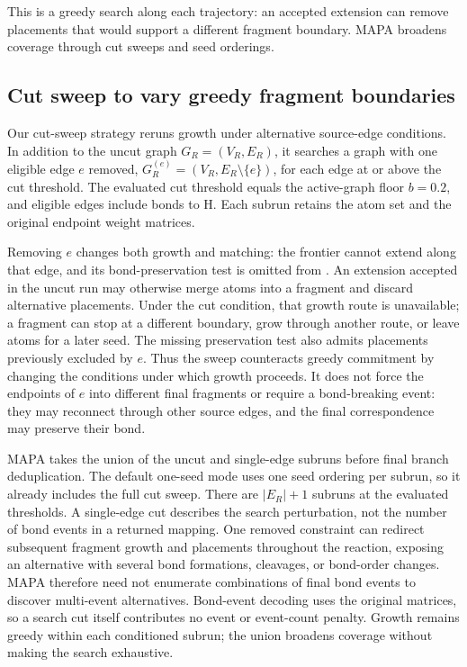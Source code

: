 This is a greedy search along each trajectory: an accepted extension can remove placements that would support a different fragment boundary. MAPA broadens coverage through cut sweeps and seed orderings.

\subsection{Cut sweep to vary greedy fragment boundaries}
\label{sec:cut-sweep}

Our cut-sweep strategy reruns growth under alternative source-edge conditions. In addition to the uncut graph $G_R=(V_R,E_R)$, it searches a graph with one eligible edge $e$ removed, $G_R^{(e)}=(V_R,E_R\setminus\{e\})$, for each edge at or above the cut threshold. The evaluated cut threshold equals the active-graph floor $b=0.2$, and eligible edges include bonds to H. Each subrun retains the atom set and the original endpoint weight matrices.

Removing $e$ changes both growth and matching: the frontier cannot extend along that edge, and its bond-preservation test is omitted from . An extension accepted in the uncut run may otherwise merge atoms into a fragment and discard alternative placements. Under the cut condition, that growth route is unavailable; a fragment can stop at a different boundary, grow through another route, or leave atoms for a later seed. The missing preservation test also admits placements previously excluded by $e$. Thus the sweep counteracts greedy commitment by changing the conditions under which growth proceeds. It does not force the endpoints of $e$ into different final fragments or require a bond-breaking event: they may reconnect through other source edges, and the final correspondence may preserve their bond.

MAPA takes the union of the uncut and single-edge subruns before final branch deduplication. The default one-seed mode uses one seed ordering per subrun, so it already includes the full cut sweep. There are $|E_R|+1$ subruns at the evaluated thresholds. A single-edge cut describes the search perturbation, not the number of bond events in a returned mapping. One removed constraint can redirect subsequent fragment growth and placements throughout the reaction, exposing an alternative with several bond formations, cleavages, or bond-order changes. MAPA therefore need not enumerate combinations of final bond events to discover multi-event alternatives. Bond-event decoding uses the original matrices, so a search cut itself contributes no event or event-count penalty. Growth remains greedy within each conditioned subrun; the union broadens coverage without making the search exhaustive.

